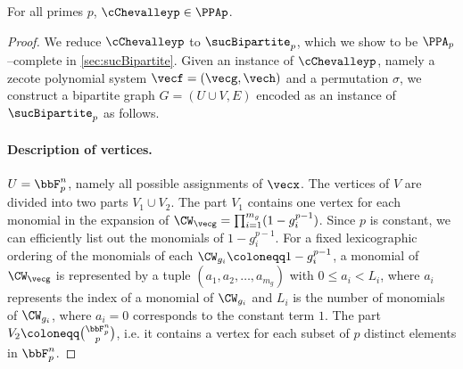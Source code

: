 \begin{lemma} \label{lem:combinedChevalleyPPAp}
 For all primes $p$, $\cChevalleyp \in \PPAp$.
\end{lemma}
\begin{proof}We reduce $\cChevalleyp$ to $\sucBipartite_p$, which we show to be $\PPA_p$--complete in \autoref{sec:sucBipartite}. Given an instance of $\cChevalleyp$, namely a zecote polynomial system $\vecf = (\vecg, \vech)$ and a permutation $\sigma$, we construct a bipartite graph $G = (U \cup V, E)$ encoded as an instance of $\sucBipartite_p$ as follows. 

 \paragraph{Description of vertices.} $U = \bbF_p^n$, namely all possible assignments
 of $\vecx$. The vertices of $V$ are divided into two parts $V_1 \cup V_2$.
 The part $V_1$ contains one vertex for each monomial in the expansion of $\CW_{\vecg} = \prod_{i = 1}^{m_g} (1 - g_i^{p-1})$. Since $p$ is constant, we can
 efficiently list out the monomials of $1 - g_{i}^{p-1}$. For a fixed lexicographic ordering of the
 monomials of each $\CW_{g_i} \coloneqq 1 - g_{i}^{p-1}$, a
 monomial of $\CW_{\vecg}$ is represented by a tuple
 $(a_1, a_{2}, \dots, a_{m_g})$ with $0 \leq a_{i} < L_{i}$, where
 $a_{i}$ represents the index of a monomial of $\CW_{g_i}$ and  $L_{i}$
 is the number of monomials of $\CW_{g_i}$, where $a_i = 0$ corresponds to the constant term $1$. The part $V_2 \coloneqq \binom{\bbF_p^n}{p}$, i.e. it contains a vertex for each subset of $p$ distinct elements in $\bbF_p^n$.



\end{proof}
